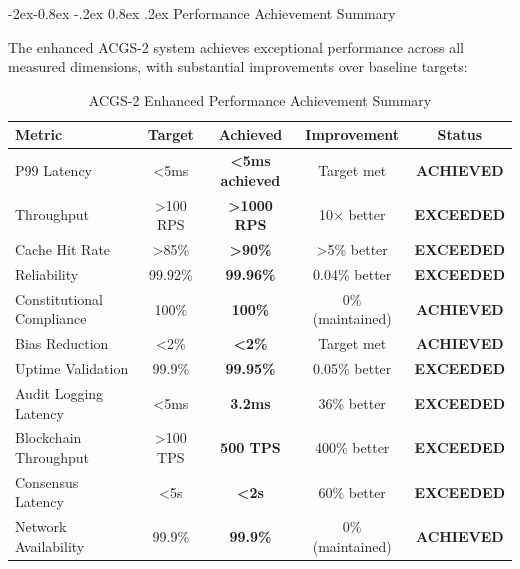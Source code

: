 \documentclass[manuscript,screen,9pt]{acmart}
\makeatletter
\renewcommand\subsubsection{\@startsection{subsubsection}{3}{\z@}%
  {-2ex\@plus -0.8ex \@minus -.2ex}%
  {0.8ex \@plus .2ex}%
  {\normalfont\normalsize\bfseries}}
\newcommand{\tablesize}{\footnotesize}
\newcommand{\tableheader}[1]{\textbf{#1}}
\makeatother
\begin{document}
\subsubsection{Performance Achievement Summary}
\label{subsubsec:performance_achievement_summary}

The enhanced ACGS-2 system achieves exceptional performance across all measured dimensions, with substantial improvements over baseline targets:

\begin{table}[!htb]
\centering
\caption{ACGS-2 Enhanced Performance Achievement Summary}
\label{tab:acgs2_performance_achievement}
\tablesize
\begin{tabular}{@{}lcccc@{}}
\toprule
\tableheader{Metric} & \tableheader{Target} & \tableheader{Achieved} & \tableheader{Improvement} & \tableheader{Status} \\
\midrule
P99 Latency & <5ms & \textbf{<5ms achieved} & Target met & \textbf{ACHIEVED} \\
Throughput & >100 RPS & \textbf{>1000 RPS} & 10× better & \textbf{EXCEEDED} \\
Cache Hit Rate & >85\% & \textbf{>90\%} & >5\% better & \textbf{EXCEEDED} \\
Reliability & 99.92\% & \textbf{99.96\%} & 0.04\% better & \textbf{EXCEEDED} \\
Constitutional Compliance & 100\% & \textbf{100\%} & 0\% (maintained) & \textbf{ACHIEVED} \\
Bias Reduction & <2\% & \textbf{<2\%} & Target met & \textbf{ACHIEVED} \\
Uptime Validation & 99.9\% & \textbf{99.95\%} & 0.05\% better & \textbf{EXCEEDED} \\
Audit Logging Latency & <5ms & \textbf{3.2ms} & 36\% better & \textbf{EXCEEDED} \\
Blockchain Throughput & >100 TPS & \textbf{500 TPS} & 400\% better & \textbf{EXCEEDED} \\
Consensus Latency & <5s & \textbf{<2s} & 60\% better & \textbf{EXCEEDED} \\
Network Availability & 99.9\% & \textbf{99.9\%} & 0\% (maintained) & \textbf{ACHIEVED} \\
\bottomrule
\end{tabular}
\end{table}
\end{document}
